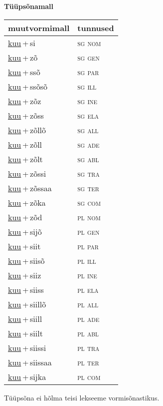 
\vspace{1.8em}
\begin{minipage}{\textwidth}
\textbf{Tüüpsõnamall \,}\\

\begin{sideways}
\begin{tabular}{l l}
muutvormimall & tunnused \\
\hline
\underline{kuu}\,+\,si & \textsc{ sg nom } \\
\underline{kuu}\,+\,zõ & \textsc{ sg gen } \\
\underline{kuu}\,+\,ssõ & \textsc{ sg par } \\
\underline{kuu}\,+\,ssõsõ & \textsc{ sg ill } \\
\underline{kuu}\,+\,zõz & \textsc{ sg ine } \\
\underline{kuu}\,+\,zõss & \textsc{ sg ela } \\
\underline{kuu}\,+\,zõllõ & \textsc{ sg all } \\
\underline{kuu}\,+\,zõll & \textsc{ sg ade } \\
\underline{kuu}\,+\,zõlt & \textsc{ sg abl } \\
\underline{kuu}\,+\,zõssi & \textsc{ sg tra } \\
\underline{kuu}\,+\,zõssaa & \textsc{ sg ter } \\
\underline{kuu}\,+\,zõka & \textsc{ sg com } \\
\underline{kuu}\,+\,zõd & \textsc{ pl nom } \\
\underline{kuu}\,+\,sijõ & \textsc{ pl gen } \\
\underline{kuu}\,+\,siit & \textsc{ pl par } \\
\underline{kuu}\,+\,siisõ & \textsc{ pl ill } \\
\underline{kuu}\,+\,siiz & \textsc{ pl ine } \\
\underline{kuu}\,+\,siiss & \textsc{ pl ela } \\
\underline{kuu}\,+\,siillõ & \textsc{ pl all } \\
\underline{kuu}\,+\,siill & \textsc{ pl ade } \\
\underline{kuu}\,+\,siilt & \textsc{ pl abl } \\
\underline{kuu}\,+\,siissi & \textsc{ pl tra } \\
\underline{kuu}\,+\,siissaa & \textsc{ pl ter } \\
\underline{kuu}\,+\,sijka & \textsc{ pl com } \\
\end{tabular}
\end{sideways}
\label{tab:tüüpsõnamall-kuusi}

\end{minipage}

 
\vspace{1em}
\noindent Tüüpsõna ei hõlma teisi lekseeme vormi\-sõnastikus.
